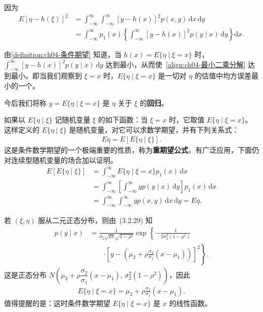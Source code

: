 \documentclass[../../main.tex]{subfiles}
\begin{document}
因为
\begin{align}
E[\eta-h(\xi)]^2
&=\int_{-\infty}^{\infty}\int_{-\infty}^{\infty}[y-h(x)]^2 p(x,y)\,\mathrm{d}x\,\mathrm{d}y\nonumber\\
&=\int_{-\infty}^{\infty}p_1(x)\left\{\int_{-\infty}^{\infty}[y-h(x)]^2 p(y\mid x)\,\mathrm{d}y\right\}\mathrm{d}x.\label{align:ch04-最小二乘分解}
\end{align}

由\cref{definition:ch04-条件期望} 知道，当 $h(x)=E\{\eta\mid\xi=x\}$ 时，$\int_{-\infty}^{\infty}[y-h(x)]^2 p(y\mid x)\,\mathrm{d}y$ 达到最小，从而使~\eqref{align:ch04-最小二乘分解} 达到最小。即当我们观察到 $\xi=x$ 时，$E\{\eta\mid\xi=x\}$ 是一切对 $\eta$ 的估值中均方误差最小的一个。

今后我们将称 $y=E\{\eta\mid\xi=x\}$ 是 $\eta$ 关于 $\xi$ 的\textbf{回归}。

如果以 $E\{\eta\mid\xi\}$ 记随机变量 $\xi$ 的如下函数：当 $\xi=x$ 时，它取值 $E\{\eta\mid\xi=x\}$。这样定义的 $E\{\eta\mid\xi\}$ 是随机变量，对它可以求数学期望，并有下列关系式：
\begin{align}
E\eta=E[E\{\eta\mid\xi\}].\label{align:ch04-重期望公式}
\end{align}
这是条件数学期望的一个极端重要的性质，称为\textbf{重期望公式}，有广泛应用，下面仍对连续型随机变量的场合加以证明。
\begin{align*}
E[E\{\eta\mid\xi\}]
&=\int_{-\infty}^{\infty}E\{\eta\mid\xi=x\}p_1(x)\,\mathrm{d}x\\
&=\int_{-\infty}^{\infty}\left[\int_{-\infty}^{\infty}yp(y\mid x)\,\mathrm{d}y\right]p_1(x)\,\mathrm{d}x\\
&=\int_{-\infty}^{\infty}\int_{-\infty}^{\infty}yp(x,y)\,\mathrm{d}x\,\mathrm{d}y=E\eta.
\end{align*}

\begin{example}[二元正态的条件期望]\label{example:ch04-二元正态条件期望}
若 $(\xi,\eta)$ 服从二元正态分布，则由~(3.2.29) 知
\begin{align*}
p(y\mid x)&=\frac{1}{\sigma_2\sqrt{2\pi}\sqrt{1-\rho^2}}
\exp\left\{-\frac{1}{2\sigma_2^2(1-\rho^2)}\right.\\
&\qquad\left.\cdot\left[y-\left(\mu_2+\rho\frac{\sigma_2}{\sigma_1}(x-\mu_1)\right)\right]^2\right\}.
\end{align*}
这是正态分布 $N\left(\mu_2+\rho\dfrac{\sigma_2}{\sigma_1}(x-\mu_1),\,\sigma_2^2(1-\rho^2)\right)$，因此
\begin{align}
E\{\eta\mid\xi=x\}=\mu_2+\rho\frac{\sigma_2}{\sigma_1}(x-\mu_1).\label{align:ch04-二元正态条件期望结果}
\end{align}
值得提醒的是：这时条件数学期望 $E\{\eta\mid\xi=x\}$ 是 $x$ 的线性函数。
\end{example}
\end{document}
